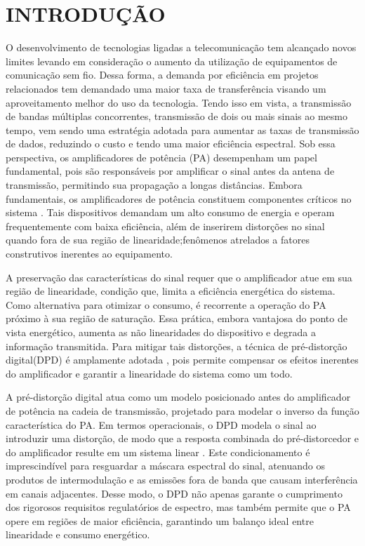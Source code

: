 
\chapter{INTRODUÇÃO}

O desenvolvimento de tecnologias ligadas a telecomunicação tem alcançado novos limites levando em consideração o aumento da utilização de equipamentos de comunicação sem fio. Dessa forma, a demanda por eficiência em projetos relacionados tem demandado uma maior taxa de transferência visando um aproveitamento melhor do uso da tecnologia. Tendo isso em vista, a transmissão de bandas múltiplas concorrentes, transmissão de dois ou mais sinais ao mesmo tempo, vem sendo uma estratégia adotada para aumentar as taxas de transmissão de dados, reduzindo o custo e tendo uma maior eficiência espectral\cite{8070682}. Sob essa perspectiva, os amplificadores de potência (PA) desempenham um papel fundamental, pois são responsáveis por amplificar o sinal antes da antena de transmissão, permitindo sua propagação a longas distâncias.
Embora fundamentais, os amplificadores de potência constituem componentes críticos no sistema \cite{martins2011eficiencia}. Tais dispositivos demandam um alto consumo de energia e operam frequentemente com baixa eficiência, além de inserirem distorções no sinal quando fora de sua região de linearidade;fenômenos atrelados a fatores construtivos inerentes ao equipamento.

A preservação das características do sinal requer que o amplificador atue em sua região de linearidade, condição que, limita a eficiência energética do sistema. Como alternativa para otimizar o consumo, é recorrente a operação do PA próximo à sua região de saturação. Essa prática, embora vantajosa do ponto de vista energético, aumenta as não linearidades do dispositivo e degrada a informação transmitida. Para mitigar tais distorções, a técnica de pré-distorção digital(DPD) é amplamente adotada \cite{9427989}, pois permite compensar os efeitos inerentes do amplificador e garantir a linearidade do sistema como um todo.

A pré-distorção digital atua como um modelo posicionado antes do amplificador de potência na cadeia de transmissão, projetado para modelar o inverso da função característica do PA. Em termos operacionais, o DPD modela o sinal ao introduzir uma distorção, de modo que a resposta combinada do pré-distorcedor e do amplificador resulte em um sistema linear \cite{alvarado2019papr}. Este condicionamento é imprescindível para resguardar a máscara espectral do sinal, atenuando os produtos de intermodulação e as emissões fora de banda que causam interferência em canais adjacentes. Desse modo, o DPD não apenas garante o cumprimento dos rigorosos requisitos regulatórios de espectro, mas também permite que o PA opere em regiões de maior eficiência, garantindo um balanço ideal entre linearidade e consumo energético.

